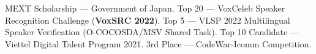
\begin{scholarship}
    {MEXT Scholarship --- Government of Japan.}
    {Top 20 --- VoxCeleb Speaker Recognition Challenge (\textbf{VoxSRC 2022}).}
    {Top 5 --- VLSP 2022 Multilingual Speaker Verification (O-COCOSDA/MSV Shared Task).}
    {Top 10 Candidate --- Viettel Digital Talent Program 2021.}
    {3rd Place --- CodeWar-Icomm Competition.}
\end{scholarship}
